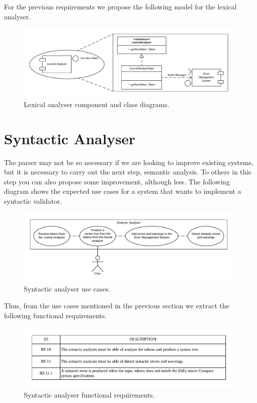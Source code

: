 For the previous requirements we propose the following model for the lexical analyser.

\begin{figure}[h!]
    \includegraphics[width=\textwidth]{images/lex-diagram.pdf}
    \centering
    \caption[Lexical analyser component and class diagrams]{Lexical analyser component and class diagrams.}
    \label{fig:lex-diag}
\end{figure}

\section{Syntactic Analyser}
The parser may not be so necessary if we are looking to improve existing systems, but it is
necessary to carry out the next step, semantic analysis. To others
in this step you can also propose some improvement, although less. The following diagram
shows the expected use cases for a system that wants to implement a syntactic validator.

\begin{figure}[h!]
    \includegraphics[scale=0.6]{images/sin-use-case.pdf}
    \centering
    \caption[Syntactic analyser use cases]{Syntactic analyser use cases.}
    \label{fig:sin-use-case}
\end{figure}

Thus, from the use cases mentioned in the previous section we
extract the following functional requirements.

\begin{figure}[h!]
    \includegraphics[width=\textwidth]{images/sin-reqf.pdf}
    \centering
    \caption[Syntactic analyser functional requirements]{Syntactic analyser functional requirements.}
    \label{fig:sin-reqf}
\end{figure}


